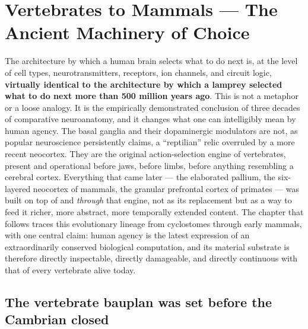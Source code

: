 ﻿\section{Vertebrates to Mammals --- The Ancient Machinery of Choice}\label{05_vertebrates-vertebrates-to-mammals-the-ancient-machinery-of-choice}

The architecture by which a human brain selects what to do next is, at the level of cell types, neurotransmitters, receptors, ion channels, and circuit logic, \textbf{virtually identical to the architecture by which a lamprey selected what to do next more than 500 million years ago}. This is not a metaphor or a loose analogy. It is the empirically demonstrated conclusion of three decades of comparative neuroanatomy, and it changes what one can intelligibly mean by human agency. The basal ganglia and their dopaminergic modulators are not, as popular neuroscience persistently claims, a ``reptilian'' relic overruled by a more recent neocortex. They are the original action-selection engine of vertebrates, present and operational before jaws, before limbs, before anything resembling a cerebral cortex. Everything that came later --- the elaborated pallium, the six-layered neocortex of mammals, the granular prefrontal cortex of primates --- was built on top of and \emph{through} that engine, not as its replacement but as a way to feed it richer, more abstract, more temporally extended content. The chapter that follows traces this evolutionary lineage from cyclostomes through early mammals, with one central claim: human agency is the latest expression of an extraordinarily conserved biological computation, and its material substrate is therefore directly inspectable, directly damageable, and directly continuous with that of every vertebrate alive today.

\subsection{The vertebrate bauplan was set before the Cambrian closed}\label{05_vertebrates-the-vertebrate-bauplan-was-set-before-the-cambrian-closed}

